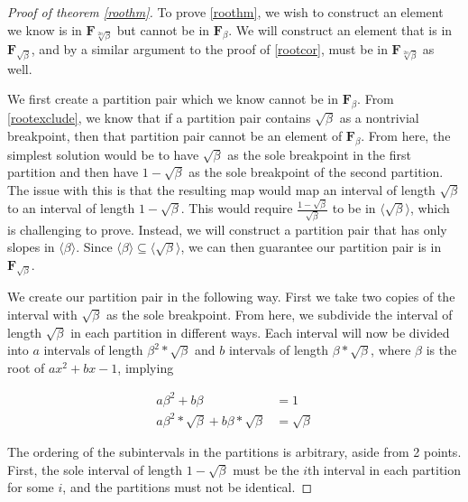 \documentclass[10pt,a4paper]{amsart}
\newcommand{\FN}[1]{$\textbf{F}_{#1}$}
\begin{document}
\begin{proof}[Proof of theorem \ref{roothm}]
To prove \ref{roothm}, we wish to construct an element we know is in \FN{\sqrt[2n]{\beta}} but cannot be in \FN{\beta}. We will construct an element that is in \FN{\sqrt{\beta}}, and by a similar argument to the proof of \ref{rootcor}, must be in \FN{\sqrt[2n]{\beta}} as well.
\par
We first create a partition pair which we know cannot be in \FN{\beta}. From \ref{rootexclude}, we know that if a partition pair contains $\sqrt{\beta}$ as a nontrivial breakpoint, then that partition pair cannot be an element of \FN{\beta}. From here, the simplest solution would be to have $\sqrt{\beta}$ as the sole breakpoint in the first partition and then have $1-\sqrt{\beta}$ as the sole breakpoint of the second partition. The issue with this is that the resulting map would map an interval of length $\sqrt{\beta}$ to an interval of length $1-\sqrt{\beta}$. This would require $\frac{1-\sqrt{\beta}}{\sqrt{\beta}}$ to be in $\langle \sqrt{\beta} \rangle$, which is challenging to prove. Instead, we will construct a partition pair that has only slopes in $\langle \beta \rangle$. Since $\langle \beta \rangle \subseteq \langle \sqrt{\beta} \rangle$, we can then guarantee our partition pair is in \FN{\sqrt{\beta}}.
\par
We create our partition pair in the following way. First we take two copies of the interval with $\sqrt{\beta}$ as the sole breakpoint. From here, we subdivide the interval of length $\sqrt{\beta}$ in each partition in different ways. Each interval will now be divided into $a$ intervals of length $\beta^2 * \sqrt{\beta}$ and $b$ intervals of length $\beta * \sqrt{\beta}$, where $\beta$ is the root of $ax^2+bx-1$, implying 

\begin{equation}
\begin{aligned}
a \beta^2 + b \beta & = 1 \\
a \beta^2 *\sqrt{\beta} + b \beta * \sqrt{\beta} & = \sqrt{\beta}
\end{aligned}
\end{equation}
\par
The ordering of the subintervals in the partitions is arbitrary, aside from 2 points. First, the sole interval of length $1-\sqrt{\beta}$ must be the $i$th interval in each partition for some $i$, and the partitions must not be identical. 


\end{proof}
\end{document}
